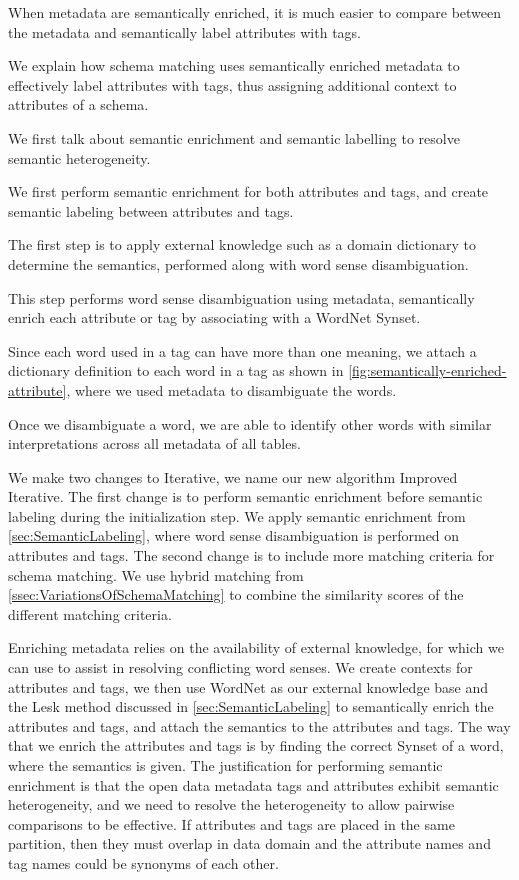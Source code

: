 When metadata are semantically enriched, it is much easier to compare between the metadata and semantically label attributes with tags.

We explain how schema matching uses semantically enriched metadata to effectively label attributes with tags, thus assigning additional context to attributes of a schema.

We first talk about semantic enrichment and semantic labelling to resolve semantic heterogeneity.

We first perform semantic enrichment for both attributes and tags, and create semantic labeling between attributes and tags.

The first step is to apply external knowledge such as a domain dictionary to determine the semantics, performed along with word sense disambiguation.

This step performs word sense disambiguation using metadata, semantically enrich each attribute or tag by associating with a WordNet Synset.

Since each word used in a tag can have more than one meaning, we attach a dictionary definition to each word in a tag as shown in \autoref{fig:semantically-enriched-attribute}, where we used metadata to disambiguate the words.

Once we disambiguate a word, we are able to identify other words with similar interpretations across all metadata of all tables.

We make two changes to Iterative, we name our new algorithm Improved Iterative. The first change is to perform semantic enrichment before semantic labeling during the initialization step. We apply semantic enrichment from \autoref{sec:SemanticLabeling}, where word sense disambiguation is performed on attributes and tags. The second change is to include more matching criteria for schema matching. We use hybrid matching from \autoref{ssec:VariationsOfSchemaMatching} to combine the similarity scores of the different matching criteria.

Enriching metadata relies on the availability of external knowledge, for which we can use to assist in resolving conflicting word senses. We create contexts for attributes and tags, we then use WordNet as our external knowledge base and the Lesk method discussed in \autoref{sec:SemanticLabeling} to semantically enrich the attributes and tags, and attach the semantics to the attributes and tags. The way that we enrich the attributes and tags is by finding the correct Synset of a word, where the semantics is given. The justification for performing semantic enrichment is that the open data metadata tags and attributes exhibit semantic heterogeneity, and we need to resolve the heterogeneity to allow pairwise comparisons to be effective. If attributes and tags are placed in the same partition, then they must overlap in data domain and the attribute names and tag names could be synonyms of each other.

